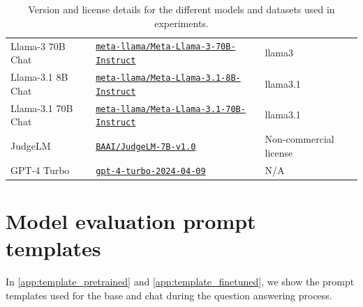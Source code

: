 \begin{table}[h]
\begin{tabular}{lll}
        Llama-3 70B Chat & \href{https://huggingface.co/meta-llama/Meta-Llama-3-70B-Instruct}{\texttt{meta-llama/Meta-Llama-3-70B-Instruct}} & llama3 \\
        Llama-3.1 8B Chat & \href{https://huggingface.co/meta-llama/Meta-Llama-3.1-8B-Instruct}{\texttt{meta-llama/Meta-Llama-3.1-8B-Instruct}} & llama3.1 \\
        Llama-3.1 70B Chat & \href{https://huggingface.co/meta-llama/Meta-Llama-3.1-70B-Instruct}{\texttt{meta-llama/Meta-Llama-3.1-70B-Instruct}} & llama3.1 \\
        JudgeLM & \href{https://huggingface.co/BAAI/JudgeLM-7B-v1.0}{\texttt{BAAI/JudgeLM-7B-v1.0}} & Non-commercial license \\
        GPT-4 Turbo & \href{https://platform.openai.com/docs/models/gpt-4-turbo-and-gpt-4}{\texttt{gpt-4-turbo-2024-04-09}} & N/A \\
        \bottomrule
    \end{tabular}
\label{tab:assets}
        \captionsetup{skip=8pt} %
\caption{Version and license details for the different models and datasets used in experiments.}
\end{table}


\section{Model evaluation prompt templates}\label{app:prompt-templates}

In \cref{app:template_pretrained} and \cref{app:template_finetuned}, we show the prompt templates used for the base and chat \evaluatormodels during the question answering process.

